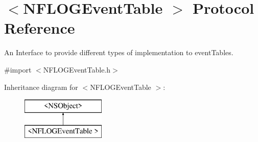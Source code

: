 \hypertarget{protocol_n_f_l_o_g_event_table_01-p}{}\section{$<$N\+F\+L\+O\+G\+Event\+Table $>$ Protocol Reference}
\label{protocol_n_f_l_o_g_event_table_01-p}


An Interface to provide different types of implementation to event\+Tables.  




{\ttfamily \#import $<$N\+F\+L\+O\+G\+Event\+Table.\+h$>$}

Inheritance diagram for $<$N\+F\+L\+O\+G\+Event\+Table $>$\+:\begin{figure}[H]
\begin{center}
\leavevmode
\includegraphics[height=2.000000cm]{protocol_n_f_l_o_g_event_table_01-p}
\end{center}
\end{figure}

